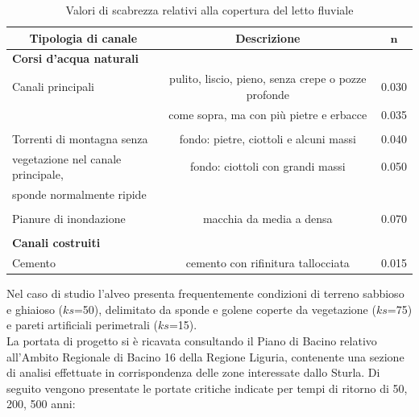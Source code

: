 \documentclass[12pt]{article} %
\begin{document}
\begin{table}[H]
    \centering
    \begin{tabular}{lcc}
        \hline
        \multicolumn{1}{c}{\textbf{Tipologia di canale}} & \textbf{Descrizione} & $\mathbf{n}$  \\
        \hline
        \textbf{Corsi d'acqua naturali} & &\\
        \hspace{1.5pt} Canali principali & pulito, liscio, pieno, senza crepe o pozze profonde & 0.030\\
        & come sopra, ma con più pietre e erbacce &  0.035\\
        [-1em]\\
        \hspace{1.5pt} Torrenti di montagna senza & fondo: pietre, ciottoli e alcuni massi & 0.040\\
        \hspace{1.5pt} vegetazione nel canale principale, & fondo: ciottoli con grandi massi & 0.050\\
        \hspace{1.5pt} sponde normalmente ripide & &\\
        [-1em]\\
        \hspace{1.5pt} Pianure di inondazione & macchia da media a densa & 0.070\\
        [-1em]\\
        \textbf{Canali costruiti} & &\\
        \hspace{1.5pt} Cemento & cemento con rifinitura tallocciata & 0.015\\
        \hline
    \end{tabular}
    \caption{Valori di scabrezza relativi alla copertura del letto fluviale}
    \label{tab:Manning_alvei}
\end{table}

\noindent Nel caso di studio l'alveo presenta frequentemente condizioni di terreno sabbioso e ghiaioso ($ks$=50), delimitato da sponde e golene coperte da vegetazione ($ks$=75) e pareti artificiali perimetrali ($ks$=15).\\
La portata di progetto si è ricavata consultando il Piano di Bacino relativo all'Ambito Regionale di Bacino 16 della Regione Liguria, contenente una sezione di analisi effettuate in corrispondenza delle zone interessate dallo Sturla. Di seguito vengono presentate le portate critiche indicate per tempi di ritorno di 50, 200, 500 anni:
\end{document}
